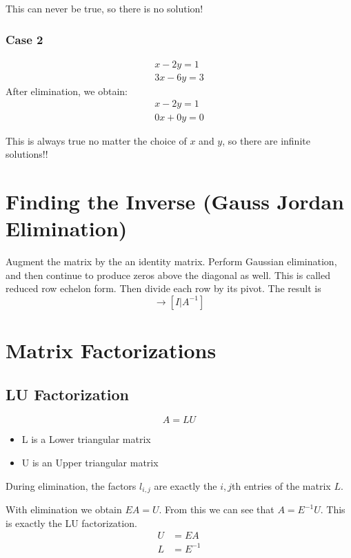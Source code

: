 \documentclass[12pt]{article}
\begin{document}
This can never be true, so there is no solution!

\subsubsection{Case 2}
\begin{align*}
x - 2y = 1\\
3x - 6y = 3
\end{align*}
After elimination, we obtain:
\begin{align*}
x - 2y = 1\\
0x + 0y = 0
\end{align*}

This is always true no matter the choice of $x$ and $y$, so there are infinite solutions!!


\section{Finding the Inverse (Gauss Jordan Elimination)}
Augment the matrix by the an identity matrix.  Perform Gaussian elimination, and then continue to produce zeros above the diagonal as well. This is called reduced row echelon form. Then divide each row by its pivot. The result is 
\begin{equation*}
[A | I] \rightarrow [I | A^{-1}] 
\end{equation*}



\section{Matrix Factorizations}
\subsection{LU Factorization}
\begin{equation*}
A = LU
\end{equation*}

\begin{itemize}
\item L is a Lower triangular matrix
\item U is an Upper triangular matrix
\end{itemize}

During elimination, the factors $l_{i,j}$ are exactly the $i,j$th entries of the matrix $L$.  

With elimination we obtain $EA = U$.  From this we can see that $A = E^{-1} U$.  This is exactly the LU factorization.
\begin{align*}
U &= EA\\
L &= E^{-1} 
\end{align*}
\end{document}
